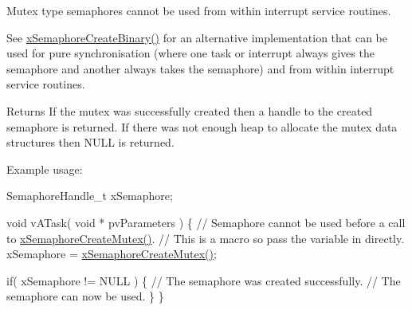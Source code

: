 Mutex type semaphores cannot be used from within interrupt service routines.

See \hyperlink{vendor_2ceedling_2plugins_2freertos_2src_2freertos_2include_2semphr_8h_acba963695e4f159d9bfa2394cae5badc}{x\+Semaphore\+Create\+Binary()} for an alternative implementation that can be used for pure synchronisation (where one task or interrupt always \textquotesingle{}gives\textquotesingle{} the semaphore and another always \textquotesingle{}takes\textquotesingle{} the semaphore) and from within interrupt service routines.

\begin{DoxyReturn}{Returns}
If the mutex was successfully created then a handle to the created semaphore is returned. If there was not enough heap to allocate the mutex data structures then N\+U\+LL is returned.
\end{DoxyReturn}
Example usage\+: 
\begin{DoxyPre}
SemaphoreHandle\_t xSemaphore;\end{DoxyPre}



\begin{DoxyPre}void vATask( void * pvParameters )
\{
 // Semaphore cannot be used before a call to \hyperlink{vendor_2ceedling_2plugins_2freertos_2src_2freertos_2include_2semphr_8h_aa6a00aa9b91a9e5b3ebe4ae1c3f115c6}{xSemaphoreCreateMutex()}.
 // This is a macro so pass the variable in directly.
 xSemaphore = \hyperlink{vendor_2ceedling_2plugins_2freertos_2src_2freertos_2include_2semphr_8h_aa6a00aa9b91a9e5b3ebe4ae1c3f115c6}{xSemaphoreCreateMutex()};\end{DoxyPre}



\begin{DoxyPre} if( xSemaphore != NULL )
 \{
     // The semaphore was created successfully.
     // The semaphore can now be used.
 \}
\}
\end{DoxyPre}
 